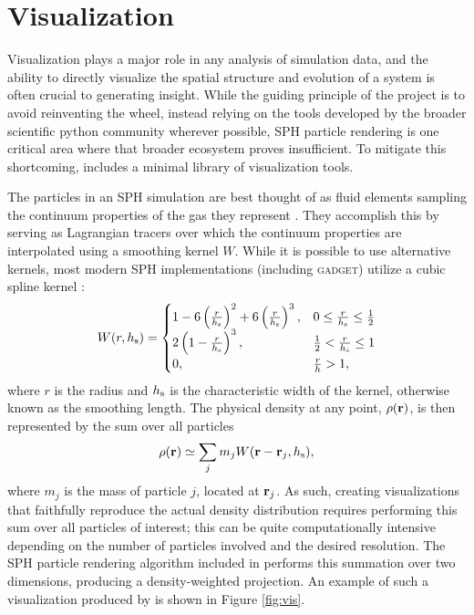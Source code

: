 \section{Visualization}
\label{sec:vis}
Visualization plays a major role in any analysis of simulation data, and the ability to directly visualize the spatial structure and evolution of a system is often crucial to generating insight.
While the guiding principle of the  project is to avoid reinventing the wheel, instead relying on the tools developed by the broader scientific python community wherever possible, SPH particle rendering is one critical area where that broader ecosystem proves insufficient.  
To mitigate this shortcoming,  includes a minimal library of visualization tools.

The particles in an SPH simulation are best thought of as fluid elements sampling the continuum properties of the gas they represent \citep{Lucy1977,GingoldMonaghan1977,Monaghan1992,Springel2010}.  They accomplish this by serving as Lagrangian tracers over which the continuum properties are interpolated using a smoothing kernel $W$. While it is possible to use alternative kernels, most modern SPH implementations (including \textsc{gadget}) utilize a cubic spline kernel \citep{Springel2014}: 
\begin{equation}
W(r,h_{\rm s}) =
     \begin{cases}
       1 - 6 \left( \frac{r}{h_{\rm s}} \right)^2 + 6 \left( \frac{r}{h_{\rm s}} \right)^3, & 0 \leq \frac{r}{h_{\rm s}} \leq \frac{1}{2}\\
       2 \left(1 - \frac{r}{h_{\rm s}}\right)^3, & \frac{1}{2} < \frac{r}{h_{\rm s}} \leq 1\\
       0, & \frac{r}{h} >  1,\\
     \end{cases}
\end{equation}
where $r$ is the radius and $h_{\rm s}$ is the characteristic width of the kernel, otherwise known as the smoothing length.  The physical density at any point, $\rho(\bf{r})$, is then represented by the sum over all particles
\begin{equation}
\rho({\bf r}) \simeq \sum_j m_j W({\bf r} - {\bf r}_j, h_{\rm s}),
\end{equation}
where $m_j$ is the mass of particle $j$, located at ${\bf r}_j$.
As such, creating visualizations that faithfully reproduce the actual density distribution requires performing this sum over all particles of interest; this can be quite computationally intensive depending on the number of particles involved and the desired resolution.
The SPH particle rendering algorithm included in  performs this summation over two dimensions, producing a density-weighted projection. An example of such a visualization produced by  is shown in Figure \ref{fig:vis}.

